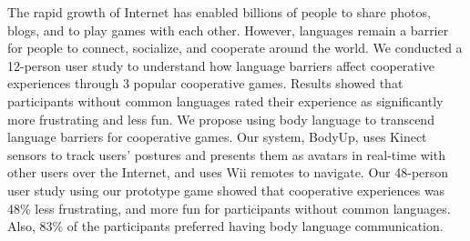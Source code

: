 
The rapid growth of Internet has enabled billions of people to share photos, blogs, and to play games with each other. However, languages remain a barrier for people to connect, socialize, and cooperate around the world. We conducted a 12-person user study to understand how language barriers affect cooperative experiences through 3 popular cooperative games. Results showed that participants without common languages rated their experience as significantly more frustrating and less fun. We propose using body language to transcend language barriers for cooperative games. Our system, BodyUp, uses Kinect sensors to track users' postures and presents them as avatars in real-time with other users over the Internet, and uses Wii remotes to navigate.  Our 48-person user study using our prototype game showed that cooperative experiences was 48\% less frustrating, and more fun for participants without common languages. Also, 83\% of the participants preferred having body language communication. 

%
